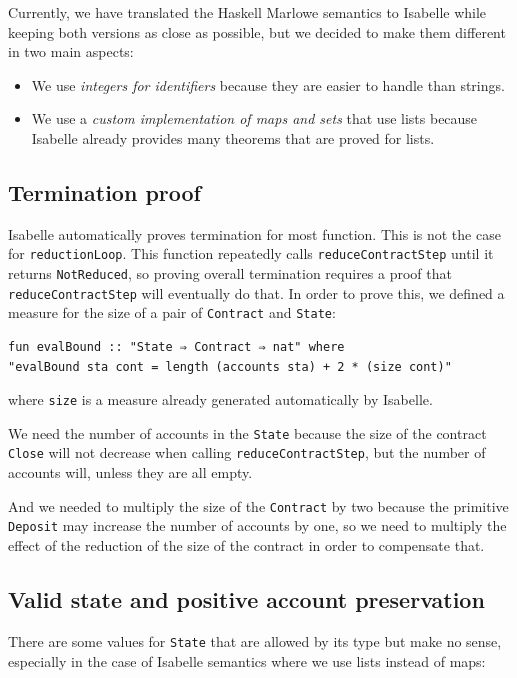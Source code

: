 \documentclass[runningheads]{llncs}
\begin{document}
Currently, we have translated the Haskell Marlowe semantics to Isabelle while keeping both versions as close as possible, but we decided to make them different in two main aspects:
\begin{itemize}
    \item We use \emph{integers for identifiers} because they are easier to handle than strings.
    \item We use a \emph{custom implementation of maps and sets} that use lists because Isabelle already provides many theorems that are proved for lists.
\end{itemize}

\subsection{Termination proof}

Isabelle automatically proves termination for most function. This is not the case for \texttt{reductionLoop}. This function repeatedly calls \texttt{reduceContractStep} until it returns \texttt{NotReduced}, so proving overall termination requires a proof that \texttt{reduceContractStep} will eventually do that. In order to prove this, we defined a measure for the size of a pair of \texttt{Contract} and \texttt{State}:

\begin{verbatim}
fun evalBound :: "State ⇒ Contract ⇒ nat" where
"evalBound sta cont = length (accounts sta) + 2 * (size cont)"
\end{verbatim}
\noindent
where \texttt{size} is a measure already generated automatically by Isabelle.

We need the number of accounts in the \texttt{State} because the size of the contract \texttt{Close} will not decrease when calling \texttt{reduceContractStep}, but the number of accounts will, unless they are all empty.

And we needed to multiply the size of the \texttt{Contract} by two because the primitive \texttt{Deposit} may increase the number of accounts by one, so we need to multiply the effect of the reduction of the size of the contract in order to compensate that.

\subsection{Valid state and positive account preservation\label{subsec:valid_state}}

There are some values for \texttt{State} that are allowed by its type but make no sense, especially in the case of Isabelle semantics where we use lists instead of maps:
\end{document}
